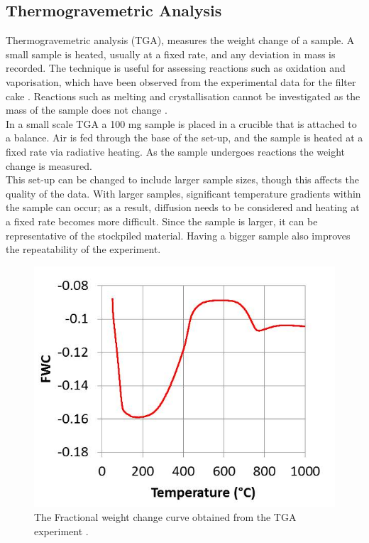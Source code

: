 \subsection{Thermogravemetric Analysis}
\label{Kis}
Thermogravemetric analysis (TGA), measures the weight change of a sample. A small sample is heated, usually at a fixed rate, and any deviation in mass is recorded. The technique is useful for assessing reactions such as oxidation and vaporisation, which have been observed from the experimental data for the filter cake \cite{Ray19}. Reactions such as melting and crystallisation cannot be investigated as the mass of the sample does not change \cite{thermal}.\\
In a small scale TGA a 100 mg sample is placed in a crucible that is attached to a balance. Air is fed through the base of the set-up, and the sample is heated at a fixed rate via radiative heating. As the sample undergoes reactions the weight change is measured.\\
This set-up can be changed to include larger sample sizes, though this affects the quality of the data. With larger samples, significant temperature gradients within the sample can occur; as a result, diffusion needs to be considered and heating at a fixed rate becomes more difficult. Since the sample is larger, it can be representative of the stockpiled material. Having a bigger sample also improves the repeatability of the experiment.\\
\begin{figure}[h!]
\centering
\includegraphics[scale=1]{figures/TGA_exp.jpg}
\caption{The Fractional weight change curve obtained from the TGA experiment \cite{Ray19}.}
\label{TGA_exp}
\end{figure} 
